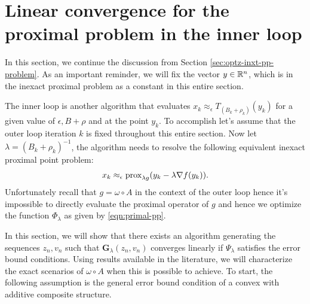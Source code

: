 \documentclass[12pt]{article}
\begin{document}
\section{Linear convergence for the proximal problem in the inner loop}
    In this section, we continue the discussion from Section \ref{sec:optz-inxt-pp-problem}. 
    As an important reminder, we will fix the vector $y \in \mathbb R^n$, which is in the inexact proximal problem as a constant in this entire section. 
    \par
    The inner loop is another algorithm that evaluates $x_k \approx_\epsilon T_{(B_k + \rho_k)}(y_k)$ for a given value of $\epsilon, B + \rho$ and at the point $y_k$. 
    To accomplish let's assume that the outer loop iteration $k$ is fixed throughout this entire section.
    Now let $\lambda = (B_k + \rho_k)^{-1}$, the algorithm needs to resolve the following equivalent inexact proximal point problem: 
    \begin{align*}
        x_k \approx_\epsilon \operatorname{prox}_{\lambda g}(y_k - \lambda \nabla f(y_k)). 
    \end{align*}
    Unfortunately recall that $g = \omega \circ A$ in the context of the outer loop hence it's impossible to directly evaluate the proximal operator of $g$ and hence we optimize the function $\Phi_\lambda$ as given by \eqref{eqn:primal-pp}. 
    \par
    In this section, we will show that there exists an algorithm generating the sequences $z_n, v_n$ such that $\mathbf G_\lambda (z_n, v_n)$ converges linearly if $\Psi_\lambda$ satisfies the error bound conditions. 
    Using results available in the literature, we will characterize the exact scenarios of $\omega \circ A$ when this is possible to achieve. 
    To start, the following assumption is the general error bound condition of a convex with additive composite structure. 
\end{document}
